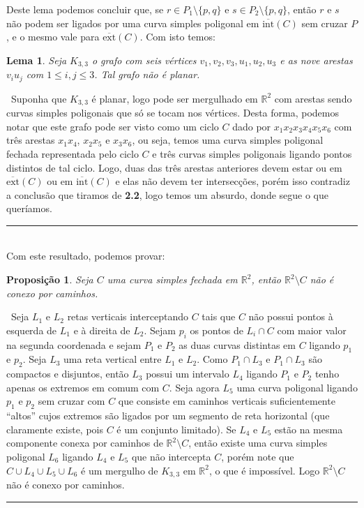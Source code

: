 \documentclass[12pt,a4paper]{article}
\newtheorem{lem}[mydef]{Lema}
\newtheorem{prop}[mydef]{Proposição}
\def\dem{\par\smallbreak\noindent {\textit{ Demonstração:}} \ }
\def\eop{\hfill\rule{2.5mm}{2.5mm} \\ }
\theoremstyle{definition}
\begin{document}
Deste lema podemos concluir que, se $r\in P_1\setminus \{ p,q \}$ e $s\in P_2\setminus \{ p,q \}$, então $r$ e $s$ não podem ser ligados por uma curva simples poligonal em $\overline{\text{int}}(C)$ sem cruzar $P$, e o mesmo vale para $\overline{\text{ext}}(C)$. Com isto temos:

\begin{lem}

    Seja $K_{3,3}$ o grafo com seis vértices $v_1,v_2,v_3,u_1,u_2,u_3$ e as nove arestas $v_i u_j$ com $1\leq i,j \leq 3$. Tal grafo não é planar. 

\end{lem}

\dem Suponha que $K_{3,3}$ é planar, logo pode ser mergulhado em $\mathbb{R}^2$ com arestas sendo curvas simples poligonais que só se tocam nos vértices. Desta forma, podemos notar que este grafo pode ser visto como um ciclo $C$ dado por $x_1x_2x_3x_4x_5x_6$ com três arestas $x_1x_4$, $x_2x_5$ e $x_3x_6$, ou seja, temos uma curva simples poligonal fechada representada pelo ciclo $C$ e três curvas simples poligonais ligando pontos distintos de tal ciclo. Logo, duas das três arestas anteriores devem estar ou em $\overline{\text{ext}}(C)$ ou em $\overline{\text{int}}(C)$ e elas não devem ter intersecções, porém isso contradiz a conclusão que tiramos de \textbf{2.2}, logo temos um absurdo, donde segue o que queríamos. \eop

Com este resultado, podemos provar:

\begin{prop}

    Seja $C$ uma curva simples fechada em $\mathbb{R}^2$, então $\mathbb{R}^2\setminus C$ não é conexo por caminhos. 

\end{prop}

\dem Seja $L_1$ e $L_2$ retas verticais interceptando $C$ tais que $C$ não possui pontos à esquerda de $L_1$ e à direita de $L_2$. Sejam $p_i$ os pontos de $L_i\cap C$ com maior valor na segunda coordenada e sejam $P_1$ e $P_2$ as duas curvas distintas em $C$ ligando $p_1$ e $p_2$. Seja $L_3$ uma reta vertical entre $L_1$ e $L_2$. Como $P_1\cap L_3$ e $P_1\cap L_3$ são compactos e disjuntos, então $L_3$ possui um intervalo $L_4$ ligando $P_1$ e $P_2$ tenho apenas os extremos em comum com $C$. Seja agora $L_5$ uma curva poligonal ligando $p_1$ e $p_2$ sem cruzar com $C$ que consiste em caminhos verticais suficientemente ``altos'' cujos extremos são ligados por um segmento de reta horizontal (que claramente existe, pois $C$ é um conjunto limitado). Se $L_4$ e $L_5$ estão na mesma componente conexa por caminhos de $\mathbb{R}^2\setminus C$, então existe uma curva simples poligonal $L_6$ ligando $L_4$ e $L_5$ que não intercepta $C$, porém note que $C\cup L_4 \cup L_5 \cup L_6$ é um mergulho de $K_{3,3}$ em $\mathbb{R}^2$, o que é impossível. Logo $\mathbb{R}^2\setminus C$ não é conexo por caminhos. \eop 
\end{document}
